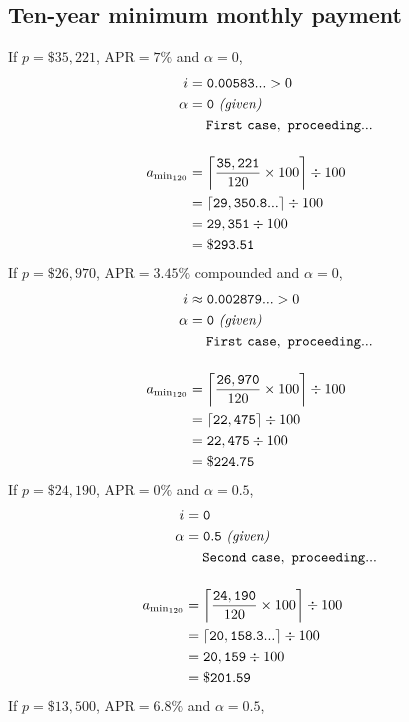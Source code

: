 \documentclass[12pt,letterpaper,oneside]{article}
\theoremstyle{remark} %
\begin{document}
	\newpage

	\subsection{Ten-year minimum monthly payment}\label{errorcheck}
	If $p=\$35,221$, $\mbox{APR}=7\%$ and $\alpha=0$,
	\begin{align*}
	i&=\mathtt{0.00583...}>0\\
	\alpha&=\mathtt{0}\ \textit{(given)}\\
	&\quad\;\mathtt{First\ case,\ proceeding...}\\[12pt]
	a_{\rm{min_{120}}}&=\left\lceil{\frac{\mathtt{35,221}}{120}\times 100}\right\rceil\div 100\\
	&=\left\lceil{\mathtt{29,350.8...}}\right\rceil\div 100\\
	&=\mathtt{29,351}\div 100\\
	&=\mathtt{\$293.51}
	\end{align*}
	If $p=\$26,970$, $\mbox{APR}=3.45\%$ compounded and $\alpha=0$,
	\begin{align*}
	i&\approx\mathtt{0.002879...}>0\\
	\alpha&=\mathtt{0}\ \textit{(given)}\\
	&\quad\;\mathtt{First\ case,\ proceeding...}\\[12pt]
	a_{\rm{min_{120}}}&=\left\lceil{\frac{\mathtt{26,970}}{120}\times 100}\right\rceil\div 100\\
	&=\left\lceil{\mathtt{22,475}}\right\rceil\div 100\\
	&=\mathtt{22,475}\div 100\\
	&=\mathtt{\$224.75}
	\end{align*}
	If $p=\$24,190$, $\mbox{APR}=0\%$ and $\alpha=0.5$,
	\begin{align*}
	i&=\mathtt{0}\\
	\alpha&=\mathtt{0.5}\ \textit{(given)}\\
	&\quad\;\mathtt{Second\ case,\ proceeding...}\\[12pt]
	a_{\rm{min_{120}}}&=\left\lceil{\frac{\mathtt{24,190}}{120}\times 100}\right\rceil\div 100\\
	&=\left\lceil{\mathtt{20,158.3...}}\right\rceil\div 100\\
	&=\mathtt{20,159}\div 100\\
	&=\mathtt{\$201.59}
	\end{align*}
	\newpage
	\newcommand{\base}{\left(1+\mathtt{0.5}\cdot\mathtt{0.00566...}\right)}
	If $p=\$13,500$, $\mbox{APR}=6.8\%$ and $\alpha=0.5$,
\end{document}

